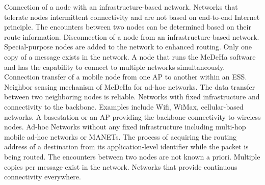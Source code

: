 \begin{description}
 {Connection of a node with an infrastructure-based network.}
 {Networks that tolerate nodes intermittent connectivity and are not based on end-to-end Internet principle.}
 {The encounters between two nodes can be determined based on their route information.}
 {Disconnection of a node from an infrastructure-based network.}
 {Special-purpose nodes are added to the network to enhanced routing.}
 {Only one copy of a message exists in the network.}
 {A node that runs the MeDeHa software and has the capability to connect to multiple networks simultaneously.}
 {Connection transfer of a mobile node from one AP to another within an ESS.}
 {Neighbor sensing mechanism of MeDeHa for ad-hoc networks.}
 {The data transfer between two neighboring nodes is reliable.}
 {Networks with fixed infrastructure and connectivity to the backbone. Examples include Wifi, WiMax, cellular-based networks.}
 {A basestation or an AP providing the backbone connectivity to wireless nodes.}
 {Ad-hoc Networks without any fixed infrastructure including multi-hop mobile ad-hoc networks or MANETs.}
 {The process of acquiring the routing address of a destination from its application-level identifier while the packet is being routed.}
 {The encounters between two nodes are not known a priori.}
 {Multiple copies per message exist in the network.}
 {Networks that provide continuous connectivity everywhere.}

\end{description}

\noindent \HRule\\[-2.35ex]
\noindent \Hslim\\[0ex]